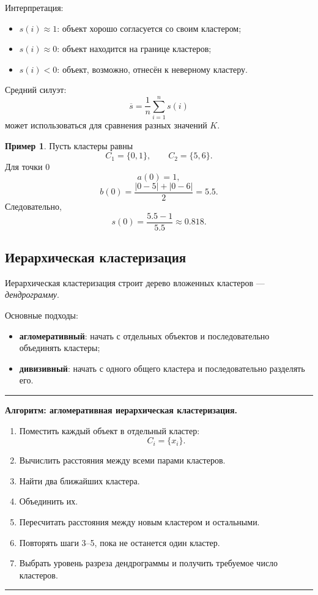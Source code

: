 \documentclass[12pt,a4paper]{article}
\theoremstyle{definition}
\newtheorem{example}[theorem]{Пример}
\theoremstyle{remark}
\newenvironment{algorithmbox}[1]
{
    \begin{center}
    \begin{minipage}{0.96\textwidth}
    \hrule
    \medskip
    \textbf{Алгоритм: #1.}
    \par\smallskip
}
{
    \medskip
    \hrule
    \end{minipage}
    \end{center}
}
\begin{document}
Интерпретация:

\begin{itemize}
    \item $s(i)\approx 1$: объект хорошо согласуется со своим кластером;
    \item $s(i)\approx 0$: объект находится на границе кластеров;
    \item $s(i)<0$: объект, возможно, отнесён к неверному кластеру.
\end{itemize}

Средний силуэт:
\[
    \overline s
    =
    \frac{1}{n}\sum_{i=1}^{n}s(i)
\]
может использоваться для сравнения разных значений $K$.

\begin{example}
Пусть кластеры равны
\[
    C_1=\{0,1\},
    \qquad
    C_2=\{5,6\}.
\]
Для точки $0$
\[
    a(0)=1,
\]
\[
    b(0)=\frac{|0-5|+|0-6|}{2}=5.5.
\]
Следовательно,
\[
    s(0)
    =
    \frac{5.5-1}{5.5}
    \approx 0.818.
\]
\end{example}

\subsection{Иерархическая кластеризация}

Иерархическая кластеризация строит дерево вложенных кластеров ---
\emph{дендрограмму}.

Основные подходы:

\begin{itemize}
    \item \textbf{агломеративный}: начать с отдельных объектов и
          последовательно объединять кластеры;
    \item \textbf{дивизивный}: начать с одного общего кластера и
          последовательно разделять его.
\end{itemize}

\begin{algorithmbox}{агломеративная иерархическая кластеризация}
\begin{enumerate}
    \item Поместить каждый объект в отдельный кластер:
          \[
              C_i=\{x_i\}.
          \]
    \item Вычислить расстояния между всеми парами кластеров.
    \item Найти два ближайших кластера.
    \item Объединить их.
    \item Пересчитать расстояния между новым кластером и остальными.
    \item Повторять шаги 3--5, пока не останется один кластер.
    \item Выбрать уровень разреза дендрограммы и получить требуемое число
          кластеров.
\end{enumerate}
\end{algorithmbox}
\end{document}

